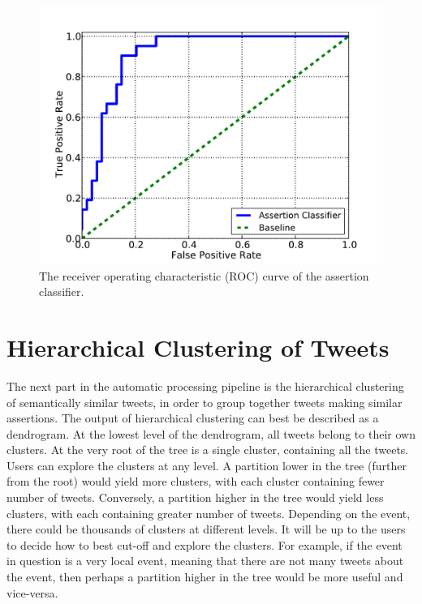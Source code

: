 \documentclass[letterpaper]{article}
\begin{document}
\begin{figure}[htbp]
\centering
\includegraphics[width=.70\columnwidth]{assertion_roc_2.pdf}
\caption{The receiver operating characteristic (ROC) curve of the assertion classifier.}
\label{fig:assertion_roc}
\end{figure}

\section{Hierarchical Clustering of Tweets}
The next part in the automatic processing pipeline is the hierarchical clustering of semantically similar tweets, in order to group together tweets making similar assertions. The output of hierarchical clustering can best be described as a dendrogram.%
At the lowest level of the dendrogram, all tweets belong to their own clusters. At the very root of the tree is a single cluster, containing all the tweets. Users can explore the clusters at any level. A partition lower in the tree (further from the root) would yield more clusters, with each cluster containing fewer number of tweets. Conversely, a partition higher in the tree would yield less clusters, with each containing greater number of tweets. Depending on the event, there could be thousands of clusters at different levels. It will be up to the users to decide how to best cut-off and explore the clusters. For example, if the event in question is a very local event, meaning that there are not many tweets about the event, then perhaps a partition higher in the tree would be more useful and vice-versa.
\end{document}
